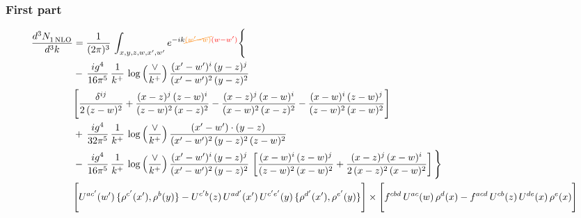 \documentclass[9pt]{article}
\numberwithin{equation}{section}
\begin{document}
\subsubsection{First part}
\begin{align}
 \frac{d^{3}N_{1\,\rm NLO}^{\rm}}{d^{3}k}  & =     \frac{1}{(2\pi)^{3}}\,\int_{x,y,z,w,x',w^{\prime}} e^{-ik{\color{orange}\cancel{(w^{\prime}-w)}}{\color{red}(w-w^{\prime})}}\Bigg\{\notag \\
& -\, \frac{ig^{4}}{16\pi^{5}}\,\frac{1}{k^{+}}\,\log{\left(\frac{\vee}{k^{+}}\right)}\, \frac{(x'-w')^{i}\,(y-z)^{j}}{(x'-w')^{2}\,(y-z)^{2}}\notag \\ &  \Bigg[\frac{\delta^{ij}}{2\,(z-w)^{2}}+\frac{(x-z)^{j}\,(z-w)^{i}}{(z-w)^{2}\,(x-z)^{2}}-\frac{(x-z)^{j}\,(x-w)^{i}}{(x-w)^{2}\,(x-z)^{2}}-\frac{(x-w)^{i}\,(z-w)^{j}}{(z-w)^{2}\,(x-w)^{2}}\Bigg] \notag \\
& +\,\frac{ig^{4}}{32\pi^{5}}\,\frac{1}{k^{+}}\,\log{\left(\frac{\vee}{k^{+}}\right)}\, \frac{(x'-w')\cdot (y-z)}{(x'-w')^{2}\,(y-z)^{2}\,(z-w)^{2}} \notag \\
& -\, \frac{ig^{4}}{16\pi^{5}}\,\frac{1}{k^{+}}\,\log{\left(\frac{\vee}{k^{+}}\right)}\,\frac{(x'-w')^{i}\,(y-z)^{j}}{(x'-w')^{2}\,(y-z)^{2}}\,\left[\frac{(x-w)^{i}\,(z-w)^{j}}{(z-w)^{2}\,(x-w)^{2}}+\frac{(x-z)^{j}\,(x-w)^{i}}{2\,(x-z)^{2}\, (x-w)^{2}}\right]\Bigg\} \notag \\ & \Bigg[U^{ac'}(w')\,\{\rho^{c'}(x'),\rho^{b}(y)\}-U^{c'b}(z)\,U^{ad'}(x')\,U^{c'e'}(y)\, \{\rho^{d'}(x'),\rho^{e'}(y)\}\Bigg]\times \Bigg[f^{cbd}\,U^{ac}(w)\,\rho^{d}(x)-f^{acd}\, U^{cb}(z)\,U^{de}(x)\,\rho^{e}(x)\Bigg]
\end{align}
\end{document}
